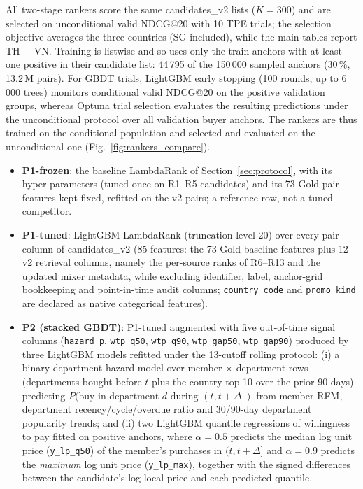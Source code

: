\documentclass{ieeeaccess}
\newcommand{\nK}{300}                %
\begin{document}
All two-stage rankers score the same candidates\_v2 lists ($K = \nK{}$) and are selected on unconditional valid NDCG@20 with 10 TPE trials;
the selection objective averages the three countries (SG included), while the main tables report TH + VN. Training is listwise and so uses only
the train anchors with at least one positive in their candidate list: 44\,795 of the 150\,000 sampled anchors (30\,\%, 13.2\,M pairs). For GBDT trials, LightGBM early stopping (100 rounds, up to 6\,000 trees) monitors conditional valid NDCG@20 on the positive validation groups, whereas Optuna trial selection evaluates the resulting predictions under the unconditional protocol over all validation buyer anchors. The rankers are thus
trained on the conditional population and selected and evaluated on the unconditional one (Fig.~\ref{fig:rankers_compare}).
\begin{itemize}
\item \textbf{P1-frozen}: the baseline LambdaRank of Section~\ref{sec:protocol}, with its hyper-parameters (tuned once on R1--R5
candidates) and its 73 Gold pair features kept fixed, refitted on the v2 pairs; a reference row, not a tuned competitor.
\item \textbf{P1-tuned}: LightGBM LambdaRank ($\text{truncation level } 20$) over every pair column of candidates\_v2 (85 features: the 73 Gold baseline features plus 12 v2 retrieval columns, namely the per-source ranks of R6--R13 and the updated mixer metadata, while excluding identifier, label, anchor-grid bookkeeping and point-in-time audit columns; \texttt{country\_code} and \texttt{promo\_kind} are declared as native categorical features).
\item \textbf{P2 (stacked GBDT)}: P1-tuned augmented with five out-of-time signal columns (\texttt{hazard\_p}, \texttt{wtp\_q50}, \texttt{wtp\_q90}, \texttt{wtp\_gap50}, \texttt{wtp\_gap90}) produced by three LightGBM models refitted under the 13-cutoff rolling protocol: (i) a binary department-hazard model over member $\times$ department rows (departments bought before $t$ plus the country top 10 over the prior 90 days) predicting $P(\text{buy in department } d \text{ during } (t, t+\Delta])$ from member RFM, department recency/cycle/overdue ratio and 30/90-day department popularity trends; and (ii) two LightGBM quantile regressions of willingness to pay fitted on positive anchors, where $\alpha = 0.5$ predicts the median log unit price (\texttt{y\_lp\_q50}) of the member's purchases in $(t, t+\Delta]$ and $\alpha = 0.9$ predicts the \emph{maximum} log unit price (\texttt{y\_lp\_max}), together with the signed differences between the candidate's log local price and each predicted quantile.

\end{itemize}
\end{document}
